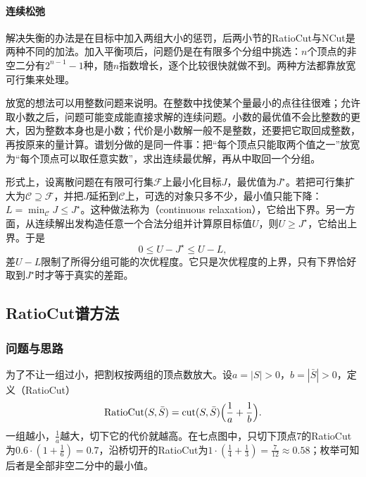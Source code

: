 \paragraph{连续松弛}
解决失衡的办法是在目标中加入两组大小的惩罚，后两小节的RatioCut与NCut是两种不同的加法。加入平衡项后，问题仍是在有限多个分组中挑选：$n$个顶点的非空二分有$2^{n-1}-1$种，随$n$指数增长，逐个比较很快就做不到。两种方法都靠放宽可行集来处理。

放宽的想法可以用整数问题来说明。在整数中找使某个量最小的点往往很难；允许取小数之后，问题可能变成能直接求解的连续问题。小数的最优值不会比整数的更大，因为整数本身也是小数；代价是小数解一般不是整数，还要把它取回成整数，再按原来的量计算。谱划分做的是同一件事：把“每个顶点只能取两个值之一”放宽为“每个顶点可以取任意实数”，求出连续最优解，再从中取回一个分组。

形式上，设离散问题在有限可行集$\mathcal F$上最小化目标$J$，最优值为$J^\star$。若把可行集扩大为$\mathcal C\supseteq\mathcal F$，并把$J$延拓到$\mathcal C$上，可选的对象只多不少，最小值只能下降：$L=\min_{\mathcal C}J\leq J^\star$。这种做法称为（continuous relaxation），它给出下界。另一方面，从连续解出发构造任意一个合法分组并计算原目标值$U$，则$U\geq J^\star$，它给出上界。于是
\[
 0\leq U-J^\star\leq U-L ,
\]
差$U-L$限制了所得分组可能的次优程度。它只是次优程度的上界，只有下界恰好取到$J^\star$时才等于真实的差距。

\subsection{RatioCut谱方法}
\label{sec:graph-spec-ratio-cut}

\subsubsection{问题与思路}

为了不让一组过小，把割权按两组的顶点数放大。设$a=|S|>0$，$b=|\bar S|>0$，定义（RatioCut）
\begin{equation}
 \operatorname{RatioCut}(S,\bar S)=\operatorname{cut}(S,\bar S)\Bigl(\frac1a+\frac1b\Bigr).
 \label{eq:graph-spec-ratio-cut}
\end{equation}
一组越小，$\frac1a$越大，切下它的代价就越高。在七点图中，只切下顶点$7$的RatioCut为$0.6\cdot(1+\tfrac16)=0.7$，沿桥切开的RatioCut为$1\cdot(\tfrac14+\tfrac13)=\tfrac7{12}\approx0.58$；枚举可知后者是全部非空二分中的最小值。

